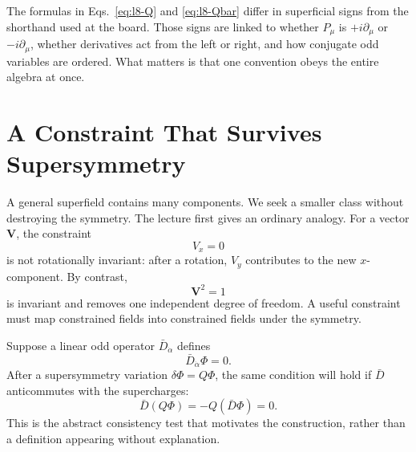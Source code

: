 \begin{classroomqa}
\end{classroomqa}

\begin{classroomqa}
\end{classroomqa}

The formulas in Eqs.~\eqref{eq:l8-Q} and \eqref{eq:l8-Qbar} differ in superficial signs from the shorthand used at the board. Those signs are linked to whether \(P_\mu\) is \(+i\partial_\mu\) or \(-i\partial_\mu\), whether derivatives act from the left or right, and how conjugate odd variables are ordered. What matters is that one convention obeys the entire algebra at once.

\section{A Constraint That Survives Supersymmetry}

A general superfield contains many components. We seek a smaller class without destroying the symmetry. The lecture first gives an ordinary analogy. For a vector \(\mathbf V\), the constraint
\begin{equation}
V_x=0
\end{equation}
is not rotationally invariant: after a rotation, \(V_y\) contributes to the new \(x\)-component. By contrast,
\begin{equation}
\mathbf V^2=1
\end{equation}
is invariant and removes one independent degree of freedom. A useful constraint must map constrained fields into constrained fields under the symmetry.

Suppose a linear odd operator \(\bar D_{\dot\alpha}\) defines
\begin{equation}
\bar D_{\dot\alpha}\Phi=0.
\label{eq:l8-chiral-constraint}
\end{equation}
After a supersymmetry variation \(\delta\Phi=Q\Phi\), the same condition will hold if \(\bar D\) anticommutes with the supercharges:
\begin{equation}
\bar D(Q\Phi)=-Q(\bar D\Phi)=0.
\end{equation}
This is the abstract consistency test that motivates the construction, rather than a definition appearing without explanation.

